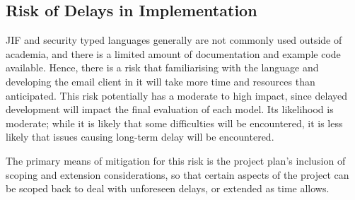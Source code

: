 \subsection{Risk of Delays in Implementation}

JIF and security typed languages generally are not commonly used outside of academia, and there is a limited amount of documentation and example code available. Hence, there is a risk that familiarising with the language and developing the email client in it will take more time and resources than anticipated. This risk potentially has a moderate to high impact, since delayed development will impact the final evaluation of each model. Its likelihood is moderate; while it is likely that some difficulties will be encountered, it is less likely that issues causing long-term delay will be encountered.

The primary means of mitigation for this risk is the project plan's inclusion of scoping and extension considerations, so that certain aspects of the project can be scoped back to deal with unforeseen delays, or extended as time allows.